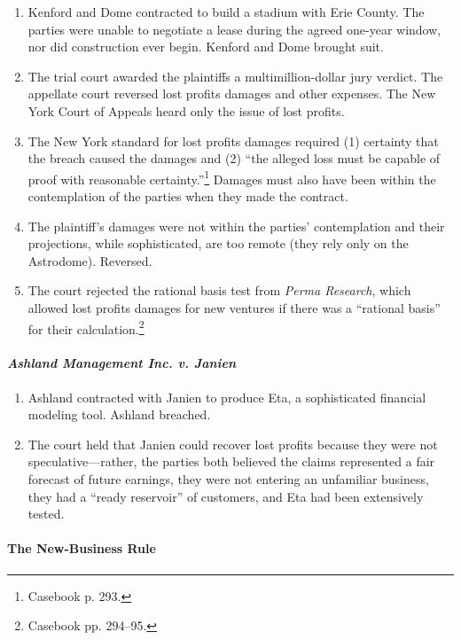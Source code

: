 \begin{enumerate}
    \item Kenford and Dome contracted to build a stadium with Erie County. 
    The parties were unable to negotiate a lease during the agreed one-year 
    window, nor did construction ever begin. Kenford and Dome brought suit.
    \item The trial court awarded the plaintiffs a multimillion-dollar jury 
    verdict. The appellate court reversed lost profits damages and other 
    expenses. The New York Court of Appeals heard only the issue of lost 
    profits.
    \item The New York standard for lost profits damages required (1) 
    certainty that the breach caused the damages and (2) ``the alleged loss 
    must be capable of proof with reasonable certainty.''\footnote{Casebook p. 
    293.} Damages must also have been within the contemplation of the parties 
    when they made the contract.
    \item The plaintiff's damages were not within the parties' contemplation 
    and their projections, while sophisticated, are too remote (they rely only 
    on the Astrodome). Reversed.
    \item The court rejected the rational basis test from \emph{Perma 
    Research}, which allowed lost profits damages for new ventures if there 
    was a ``rational basis'' for their calculation.\footnote{Casebook pp. 
    294--95.}
\end{enumerate}

\paragraph{\emph{Ashland Management Inc. v. Janien}}

\begin{enumerate}
    \item Ashland contracted with Janien to produce Eta, a sophisticated 
    financial modeling tool. Ashland breached.
    \item The court held that Janien could recover lost profits because they 
    were not speculative---rather, the parties both believed the claims 
    represented a fair forecast of future earnings, they were not entering an 
    unfamiliar business, they had a ``ready reservoir'' of customers, and Eta 
    had been extensively tested.
\end{enumerate}

\paragraph{The New-Business Rule}

